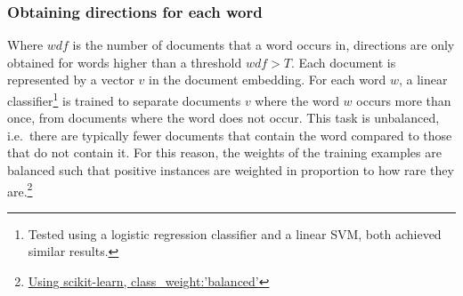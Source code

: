 





\subsubsection{Obtaining directions for each word} 
Where $\textit{wdf}$ is the number of documents that a word occurs in, directions are only obtained for words higher than a threshold  $\textit{wdf} > T$.  Each document is represented by a vector $v$ in the document embedding. %
For each word $w$,  a linear classifier\footnote{Tested using a logistic regression classifier and a linear SVM, both achieved similar results.} is trained to separate documents $v$ where the word $w $ occurs more than once, from documents where the word does not occur. %
This task is unbalanced, i.e.\ there are typically fewer documents that contain the word compared to those that do not contain it. For this reason, the weights of the training examples are balanced such that positive instances are weighted in proportion to how rare they are.\footnote{ \href{https://scikit-learn.org/stable/modules/generated/sklearn.utils.class_weight.compute_class_weight.html}{Using scikit-learn, class\_weight:'balanced'}}

